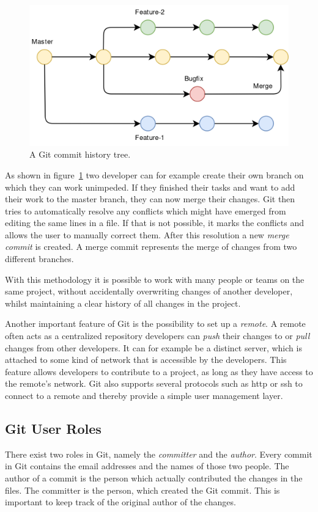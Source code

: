 \begin{figure}[H]
    \includegraphics[scale=0.35]{./graphs/git-history-branch}
    \centering
    \caption{A Git commit history tree.}\label{fig:git-commit-tree}
\end{figure}

As shown in figure~\ref{fig:git-commit-tree} two developer can for example create their own branch on which they can work unimpeded.
If they finished their tasks and want to add their work to the master branch, they can now merge their changes.
Git then tries to automatically resolve any conflicts which might have emerged from editing the same lines in a file.
If that is not possible, it marks the conflicts and allows the user to manually correct them.
After this resolution a new \emph{merge commit} is created. A merge commit represents the merge of changes from two different branches.

With this methodology it is possible to work with many people or teams on the same project, without accidentally overwriting changes of another developer, whilst maintaining a clear history of all changes in the project.

Another important feature of Git is the possibility to set up a \emph{remote}.
A remote often acts as a centralized repository developers can \emph{push} their changes to or \emph{pull} changes from other developers.
It can for example be a distinct server, which is attached to some kind of network that is accessible by the developers.
This feature allows developers to contribute to a project, as long as they have access to the remote's network.
Git also supports several protocols such as \ac{http} or \ac{ssh} to connect to a remote and thereby provide a simple user management layer.


\subsection{Git User Roles}
There exist two roles in Git, namely the \emph{committer} and the \emph{author}.
Every commit in Git contains the email addresses and the names of those two people.
The author of a commit is the person which actually contributed the changes in the files.
The committer is the person, which created the Git commit.
This is important to keep track of the original author of the changes.

